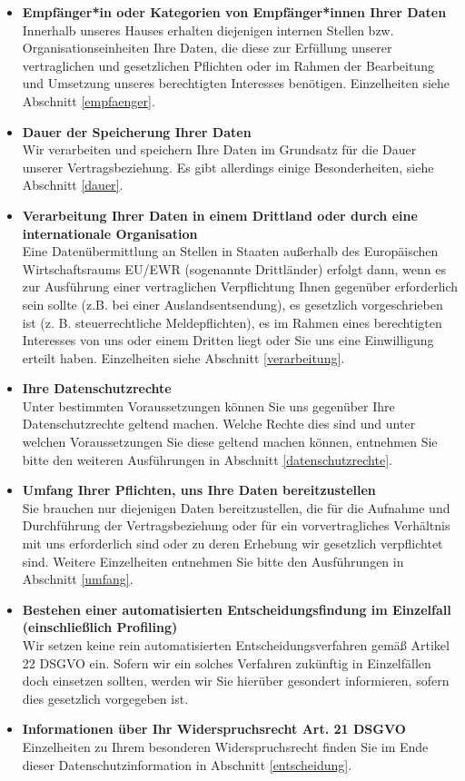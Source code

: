\documentclass[a4paper, fontsize=11pt]{scrartcl}
\begin{document}
\begin{itemize}
    \item \textbf{Empfänger*in oder Kategorien von Empfänger*innen Ihrer Daten} \\ Innerhalb unseres Hauses erhalten diejenigen internen Stellen bzw. Organisationseinheiten Ihre Daten, die diese zur Erfüllung unserer vertraglichen und gesetzlichen Pflichten oder im Rahmen der Bearbeitung und Umsetzung unseres berechtigten Interesses benötigen. Einzelheiten siehe Abschnitt \ref{empfaenger}.
    \item \textbf{Dauer der Speicherung Ihrer Daten} \\ Wir verarbeiten und speichern Ihre Daten im Grundsatz für die Dauer unserer Vertragsbeziehung. Es gibt allerdings einige Besonderheiten, siehe Abschnitt \ref{dauer}.
    \item \textbf{Verarbeitung Ihrer Daten in einem Drittland oder durch eine internationale Organisation} \\ Eine Datenübermittlung an Stellen in Staaten außerhalb des Europäischen Wirtschaftsraums EU/EWR (sogenannte Drittländer) erfolgt dann, wenn es zur Ausführung einer vertraglichen Verpflichtung Ihnen gegenüber erforderlich sein sollte (z.B. bei einer Auslandsentsendung), es gesetzlich vorgeschrieben ist (z. B. steuerrechtliche Meldepflichten), es im Rahmen eines berechtigten Interesses von uns oder einem Dritten liegt oder Sie uns eine Einwilligung erteilt haben. Einzelheiten siehe Abschnitt \ref{verarbeitung}.
    \item \textbf{Ihre Datenschutzrechte} \\ Unter bestimmten Voraussetzungen können Sie uns gegenüber Ihre Datenschutzrechte geltend machen. Welche Rechte dies sind und unter welchen Voraussetzungen Sie diese geltend machen können, entnehmen Sie bitte den weiteren Ausführungen in Abschnitt \ref{datenschutzrechte}.
    \item \textbf{Umfang Ihrer Pflichten, uns Ihre Daten bereitzustellen} \\ Sie brauchen nur diejenigen Daten bereitzustellen, die für die Aufnahme und Durchführung der Vertragsbeziehung oder für ein vorvertragliches Verhältnis mit uns erforderlich sind oder zu deren Erhebung wir gesetzlich verpflichtet sind. Weitere Einzelheiten entnehmen Sie bitte den Ausführungen in Abschnitt \ref{umfang}.
    \item \textbf{Bestehen einer automatisierten Entscheidungsfindung im Einzelfall (einschließlich Profiling)} \\ Wir setzen keine rein automatisierten Entscheidungsverfahren gemäß Artikel 22 DSGVO ein. Sofern wir ein solches Verfahren zukünftig in Einzelfällen doch einsetzen sollten, werden wir Sie hierüber gesondert informieren, sofern dies gesetzlich vorgegeben ist.
    \item \textbf{Informationen über Ihr Widerspruchsrecht Art. 21 DSGVO} \\ Einzelheiten zu Ihrem besonderen Widerspruchsrecht finden Sie im Ende dieser Datenschutzinformation in Abschnitt \ref{entscheidung}.
\end{itemize}
\end{document}
